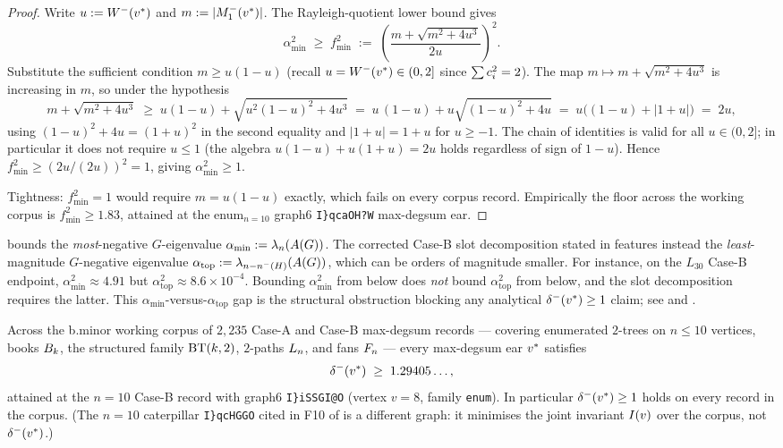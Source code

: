 \begin{proof}
Write $u := W^{-}(v^{*})$ and $m := |M_{1}^{-}(v^{*})|$. The
Rayleigh-quotient lower bound  gives
\[
\alpha_{\min}^{2} \;\ge\; f_{\min}^{2} \;:=\;
\left(\frac{m + \sqrt{m^{2} + 4 u^{3}}}{2u}\right)^{2}.
\]
Substitute the sufficient condition $m \ge u(1 - u)$ (recall
$u = W^{-}(v^{*}) \in (0, 2]$ since $\sum c_{i}^{2} = 2$). The map
$m \mapsto m + \sqrt{m^{2} + 4u^{3}}$ is increasing in $m$, so under
the hypothesis
\[
m + \sqrt{m^{2} + 4u^{3}} \;\ge\; u(1 - u) + \sqrt{u^{2}(1 - u)^{2} + 4 u^{3}}
\;=\; u\,(1 - u) + u\sqrt{(1 - u)^{2} + 4u}
\;=\; u\bigl((1 - u) + |1 + u|\bigr) \;=\; 2u,
\]
using $(1 - u)^{2} + 4u = (1 + u)^{2}$ in the second equality and
$|1 + u| = 1 + u$ for $u \ge -1$. The chain of identities is valid for
all $u \in (0, 2]$; in particular it does not require $u \le 1$ (the
algebra $u(1 - u) + u(1 + u) = 2u$ holds regardless of sign of $1 - u$). Hence
$f_{\min}^{2} \ge (2u/(2u))^{2} = 1$, giving $\alpha_{\min}^{2} \ge 1$.

Tightness: $f_{\min}^{2} = 1$ would require $m = u(1 - u)$ exactly,
which fails on every corpus record. Empirically the floor across the
working corpus is $f_{\min}^{2} \ge 1.83$, attained at the enum$_{n=10}$
graph6 \texttt{I\}qcaOH?W} max-degsum ear.
\end{proof}

\begin{remark}\label{rem:bminor-F11}
 bounds the \emph{most}-negative $G$-eigenvalue
$\alpha_{\min} := \lambda_{n}(A(G))$. The corrected Case-B slot
decomposition stated in  features instead the
\emph{least}-magnitude $G$-negative eigenvalue $\alpha_{\text{top}} :=
\lambda_{n - n^{-}(H)}(A(G))$, which can be orders of
magnitude smaller. For instance, on the $L_{30}$ Case-B endpoint,
$\alpha_{\min}^{2} \approx 4.91$ but $\alpha_{\text{top}}^{2} \approx 8.6
\times 10^{-4}$. Bounding $\alpha_{\min}^{2}$ from below does
\emph{not} bound $\alpha_{\text{top}}^{2}$ from below, and the slot
decomposition requires the latter. This
$\alpha_{\min}$-versus-$\alpha_{\text{top}}$ gap is the structural
obstruction blocking any analytical $\delta^{-}(v^{*}) \ge 1$ claim;
see  and .
\end{remark}

\begin{proposition}\label{prop:bminor-census}
Across the b.minor working corpus of $2{,}235$ Case-A and Case-B
max-degsum records — covering enumerated $2$-trees on $n \le 10$
vertices, books $B_{k}$, the structured family $\mathrm{BT}(k,2)$, $2$-paths
$L_{n}$, and fans $F_{n}$ — every max-degsum ear $v^{*}$ satisfies
\[
\delta^{-}(v^{*}) \;\ge\; 1.29405\ldots,
\]
attained at the $n = 10$ Case-B record with graph6
\texttt{I\}iSSGI@O} (vertex $v = 8$, family \texttt{enum}). In
particular $\delta^{-}(v^{*}) \ge 1$ holds on every record in the
corpus. (The $n = 10$ caterpillar
\texttt{I\}qcHG\textasciigrave GO} cited in F10 of
 is a different graph: it minimises the joint
invariant $I(v)$ over the corpus, not $\delta^{-}(v^{*})$.)
\end{proposition}

